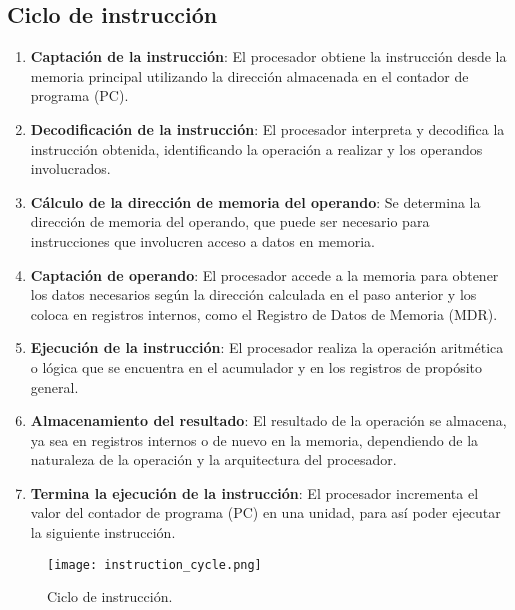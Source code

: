 \documentclass{article}
\begin{document}
\subsection*{Ciclo de instrucci\'{o}n}
\begin{enumerate}

    \item \textbf{Captaci\'{o}n de la instrucci\'{o}n}:
          El procesador obtiene la instrucci\'{o}n desde la memoria principal
          utilizando la dirección almacenada en el contador de programa (PC).

    \item \textbf{Decodificaci\'{o}n de la instrucci\'{o}n}:
          El procesador interpreta y decodifica la instrucción obtenida,
          identificando la operación a realizar y los operandos involucrados.

    \item \textbf{C\'{a}lculo de la direcci\'{o}n de memoria del operando}:
          Se determina la dirección de memoria del operando, que puede ser necesario
          para instrucciones que involucren acceso a datos en memoria.

    \item \textbf{Captaci\'{o}n de operando}:
          El procesador accede a la memoria para obtener los datos necesarios seg\'{u}n la
          direcci\'{o}n calculada en el paso anterior y los coloca en registros internos,
          como el Registro de Datos de Memoria (MDR).

    \item \textbf{Ejecuci\'{o}n de la instrucci\'{o}n}:
          El procesador realiza la operaci\'{o}n aritm\'{e}tica o l\'{o}gica que se
          encuentra en el acumulador y en los registros de prop\'{o}sito general.

    \item \textbf{Almacenamiento del resultado}:
          El resultado de la operación se almacena, ya sea en registros internos o de nuevo
          en la memoria, dependiendo de la naturaleza de la operaci\'{o}n y la arquitectura
          del procesador.
    \item \textbf{Termina la ejecuci\'{o}n de la instrucci\'{o}n}:
          El procesador incrementa el valor del contador de programa (PC) en una unidad,
          para as\'{i} poder ejecutar la siguiente instrucci\'{o}n.
\end{enumerate}

\begin{figure}[h]
    \centering
    \texttt{[image: instruction\_cycle.png]}
    \caption{Ciclo de instrucci\'{o}n.}
\end{figure}
\end{document}
